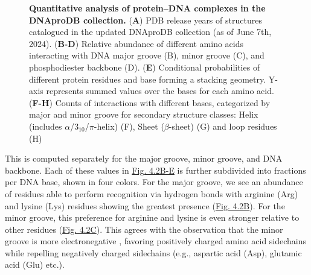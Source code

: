 \begin{center}
    \begin{figure}
        \caption[Quantitative analysis of protein–DNA complexes in the DNAproDB collection. ]{\textbf{Quantitative analysis of protein–DNA complexes in the DNAproDB collection. } ({\bf A}) PDB release years of structures catalogued in the updated DNAproDB collection (as of June 7th, 2024). ({\bf B-D})   Relative abundance of different amino acids interacting with DNA major groove (B), minor groove (C), and phosphodiester backbone (D). ({\bf E}) Conditional probabilities of different protein residues and base forming a stacking geometry. Y-axis represents summed values over the bases for each amino acid.({\bf F-H}) Counts of interactions with different bases, categorized by major and minor groove for secondary structure classes: Helix (includes $\alpha$/$3_{10}$/$\pi$-helix) (F), Sheet ($\beta$-sheet) (G) and loop residues (H) }
  \label{fig:dnaprodb2}
\end{figure}
\end{center}
This is computed separately for the major groove, minor groove, and DNA backbone. Each of these values in \hyperref[fig:dnaprodb2]{Fig. 4.2B-E} is further subdivided into fractions per DNA base, shown in four colors. For the major groove, we see an abundance of residues able to perform recognition via hydrogen bonds with arginine (Arg) and lysine (Lys) residues showing the greatest presence (\hyperref[fig:dnaprodb2]{Fig. 4.2B}). For the minor groove, this preference for arginine and lysine is even stronger relative to other residues (\hyperref[fig:dnaprodb2]{Fig. 4.2C}). This agrees with the observation that the minor groove is more electronegative \citep{rohs2009role}, favoring positively charged amino acid sidechains while repelling negatively charged sidechains (e.g., aspartic acid (Asp), glutamic acid (Glu) etc.). 
